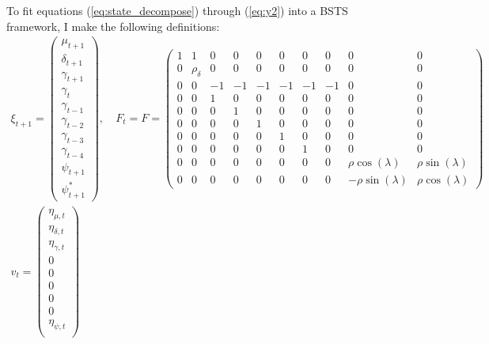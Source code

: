 \documentclass[10pt]{article}
\numberwithin{equation}{section}
\begin{document}
To fit equations (\ref{eq:state_decompose}) through (\ref{eq:y2}) into a BSTS framework, I make the following definitions:
\begin{align*}
    \xi_{t+1} = \begin{pmatrix}
        \mu_{t+1} \\
        \delta_{t+1} \\
        \gamma_{t+1} \\
        \gamma_t \\
        \gamma_{t-1} \\
        \gamma_{t-2} \\
        \gamma_{t-3} \\
        \gamma_{t-4} \\
        \psi_{t+1} \\
        \psi_{t+1}^{*}
    \end{pmatrix}, 
    &\ 
    F_t = F = \begin{pmatrix}
        1 & 1  & 0 & 0 & 0 & 0 & 0 & 0 & 0 & 0 \\
        0 & \rho_{\delta}  & 0 & 0 & 0 & 0 & 0 & 0 & 0 & 0 \\
        0 & 0 & -1 & -1 & -1 & -1 & -1 & -1 & 0 & 0 \\
        0 & 0 & 1 & 0 & 0 & 0 & 0 & 0 & 0 & 0 \\
        0 & 0 & 0 & 1 & 0 & 0 & 0 & 0 & 0 & 0 \\
        0 & 0 & 0 & 0 & 1 & 0 & 0 & 0 & 0 & 0 \\
        0 & 0 & 0 & 0 & 0 & 1 & 0 & 0 & 0 & 0 \\
        0 & 0 & 0 & 0 & 0 & 0 & 1 & 0 & 0 & 0 \\
        0 & 0 & 0 & 0 & 0 & 0 & 0 & 0 & \rho \cos(\lambda) & \rho \sin(\lambda) \\
        0 & 0 & 0 & 0 & 0 & 0 & 0 & 0 & -\rho \sin(\lambda) & \rho \cos(\lambda)
    \end{pmatrix} \\
    v_t = \begin{pmatrix}
        \eta_{\mu,t} \\
        \eta_{\delta,t} \\
        \eta_{\gamma,t} \\
        0 \\
        0 \\
        0 \\
        0 \\
        0 \\
        \eta_{\psi,t} \\

\end{pmatrix}
\end{align*}
\end{document}
